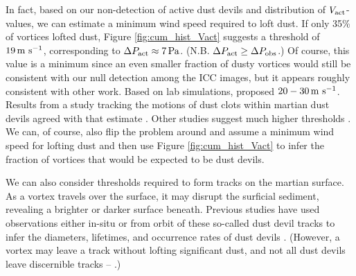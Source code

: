 \documentclass[linenumbers,trackchanges]{aastex63}
\begin{document}

In fact, based on our non-detection of active dust devils and distribution of $V_{\rm act}$-values, we can estimate a minimum wind speed required to loft dust. If only 35\% of vortices lofted dust, Figure \ref{fig:cum_hist_Vact} suggests a threshold of $19\,{\rm m\ s^{-1}}$, corresponding to $\Delta P_{\rm act} \approx 7\,{\rm Pa}$. (N.B. $\Delta P_{\rm act} \geq \Delta P_{\rm obs}$.) Of course, this value is a minimum since an even smaller fraction of dusty vortices would still be consistent with our null detection among the ICC images, but it appears roughly consistent with other work. Based on lab simulations, \citet{2003JGRE..108.5041G} proposed $20-30\,{\rm m\ s^{-1}}$. Results from a study tracking the motions of dust clots within martian dust devils agreed with that estimate \citep{2011GeoRL..3824206C}. Other studies suggest much higher thresholds \citep[\emph{cf.}][]{2006JGRE..11112002C}. We can, of course, also flip the problem around and assume a minimum wind speed for lofting dust and then use Figure \ref{fig:cum_hist_Vact} to infer the fraction of vortices that would be expected to be dust devils.

We can also consider thresholds required to form tracks on the martian surface. As a vortex travels over the surface, it may disrupt the surficial sediment, revealing a brighter or darker surface beneath. Previous studies have used observations either in-situ or from orbit of these so-called dust devil tracks to infer the diameters, lifetimes, and occurrence rates of dust devils \citep[\emph{e.g.},][]{2008JGRE..113.7002W}. (However, a vortex may leave a track without lofting significant dust, and not all dust devils leave discernible tracks -- \citealp{2005JGRE..110.6002G}.) 
\end{document}
